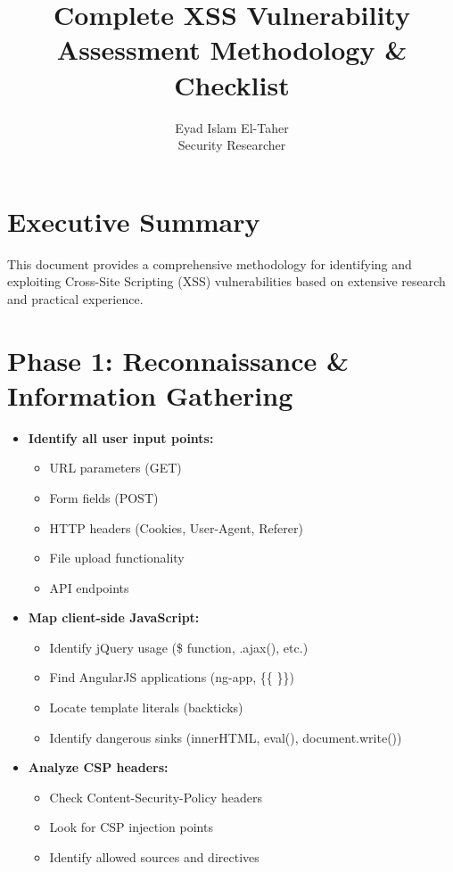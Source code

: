 \documentclass[12pt]{article}
\title{\textbf{Complete XSS Vulnerability Assessment Methodology \& Checklist}}
\author{Eyad Islam El-Taher \\ Security Researcher}
\date{}
\begin{document}
\maketitle

\section*{Executive Summary}
This document provides a comprehensive methodology for identifying and exploiting Cross-Site Scripting (XSS) vulnerabilities based on extensive research and practical experience.

\section{Phase 1: Reconnaissance \& Information Gathering}

\begin{tcolorbox}[title={\textbf{1.1 Application Mapping}}, colback=lightblue]
\begin{itemize}[leftmargin=*]
    \item \textbf{Identify all user input points:}
    \begin{itemize}
        \item URL parameters (GET)
        \item Form fields (POST) 
        \item HTTP headers (Cookies, User-Agent, Referer)
        \item File upload functionality
        \item API endpoints
    \end{itemize}
    
    \item \textbf{Map client-side JavaScript:}
    \begin{itemize}
        \item Identify jQuery usage (\$ function, .ajax(), etc.)
        \item Find AngularJS applications (ng-app, \{\{ \}\})
        \item Locate template literals (backticks)
        \item Identify dangerous sinks (innerHTML, eval(), document.write())
    \end{itemize}
    
    \item \textbf{Analyze CSP headers:}
    \begin{itemize}
        \item Check Content-Security-Policy headers
        \item Look for CSP injection points
        \item Identify allowed sources and directives
    \end{itemize}
\end{itemize}
\end{tcolorbox}
\end{document}
